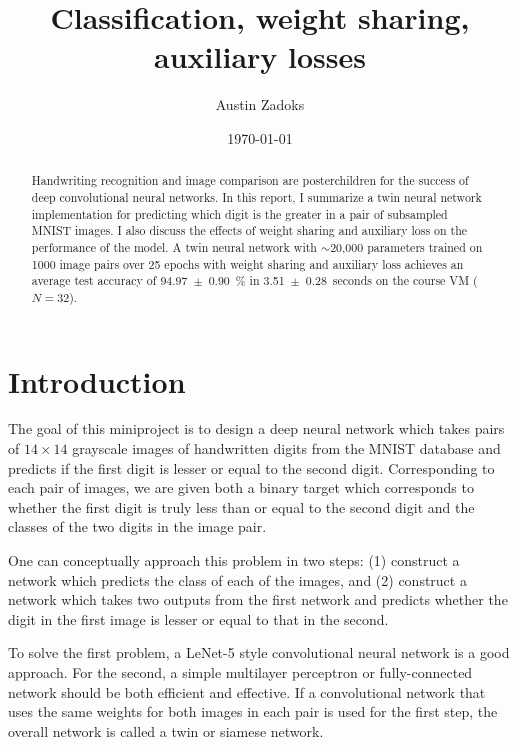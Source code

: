\documentclass[prl, article, twocolumn]{revtex4-1}
\begin{document}
\title{Classification, weight sharing, auxiliary losses}
\date{\today}
\author{Austin Zadoks}
\noaffiliation

\begin{abstract}
    Handwriting recognition and image comparison are posterchildren for the success of deep convolutional neural networks. In this report, I summarize a twin neural network implementation for predicting which digit is the greater in a pair of subsampled MNIST images. I also discuss the effects of weight sharing and auxiliary loss on the performance of the model. A twin neural network with $\sim$20,000 parameters trained on 1000 image pairs over 25 epochs with weight sharing and auxiliary loss achieves an average test accuracy of 94.97~$\pm$~0.90~\% in 3.51~$\pm$~0.28~seconds on the course VM ($N=32$).
\end{abstract}

\maketitle

\section{Introduction}
The goal of this miniproject is to design a deep neural network which takes pairs of $14 \times 14$ grayscale images of handwritten digits from the MNIST database and predicts if the first digit is lesser or equal to the second digit.
Corresponding to each pair of images, we are given both a binary target which corresponds to whether the first digit is truly less than or equal to the second digit and the classes of the two digits in the image pair.

One can conceptually approach this problem in two steps: (1) construct a network which predicts the class of each of the images, and (2) construct a network which takes two outputs from the first network and predicts whether the digit in the first image is lesser or equal to that in the second.

To solve the first problem, a LeNet-5 style convolutional neural network is a good approach. For the second, a simple multilayer perceptron or fully-connected network should be both efficient and effective. If a convolutional network that uses the same weights for both images in each pair is used for the first step, the overall network is called a twin or siamese network.
\end{document}

